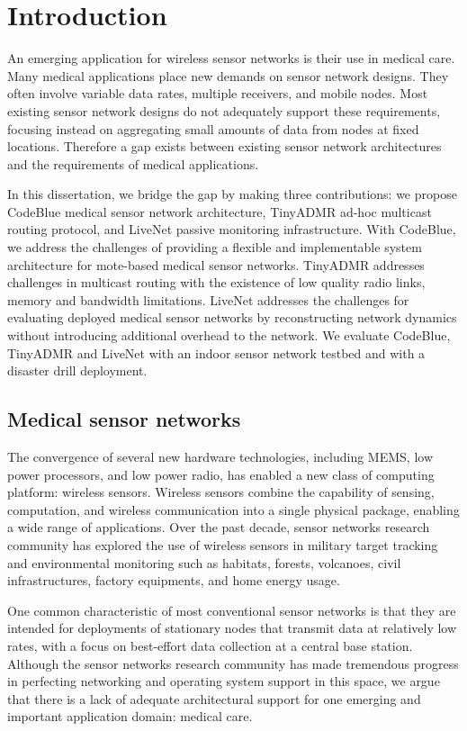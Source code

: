 \chapter{Introduction}
\label{chap-intro}

An emerging application for wireless sensor networks is their use in medical
care. Many medical applications place new demands on sensor network designs.
They often involve variable data rates, multiple receivers, and mobile
nodes. Most existing sensor network designs do not adequately support these
requirements, focusing instead on aggregating small amounts of data from nodes
at fixed locations. Therefore a gap exists between existing sensor network
architectures and the requirements of medical applications.

In this dissertation, we bridge the gap by making three contributions: we
propose CodeBlue medical sensor network architecture, TinyADMR ad-hoc multicast routing protocol, and LiveNet passive monitoring infrastructure.
With CodeBlue, we address the challenges of providing a flexible 
and implementable system architecture for mote-based medical
sensor networks. TinyADMR addresses challenges in multicast routing with the
existence of low quality radio links, memory and bandwidth limitations.
LiveNet addresses the challenges for evaluating deployed medical sensor
networks by reconstructing network dynamics without introducing additional
overhead to the network. We evaluate CodeBlue, TinyADMR and LiveNet
with an indoor sensor network testbed and with a disaster drill deployment.

\section{Medical sensor networks}

The convergence of several new hardware technologies, including MEMS, low
power processors, and low power radio, has enabled a new class of computing
platform: wireless sensors. Wireless sensors combine the capability of
sensing, computation, and wireless communication into a single physical
package, enabling a wide range of applications. Over the past decade, sensor
networks research community has explored the use of wireless sensors in
military target tracking and environmental monitoring such as habitats,
forests, volcanoes, civil infrastructures, factory equipments, and home energy
usage.

One common characteristic of most conventional sensor networks is that they
are intended for deployments of stationary nodes that transmit data at
relatively low rates, with a focus on best-effort data collection at a central
base station. Although the sensor networks research community has made
tremendous progress in perfecting networking and operating system support in
this space, we argue that there is a lack of adequate architectural
support for one emerging and important application domain: medical care.

